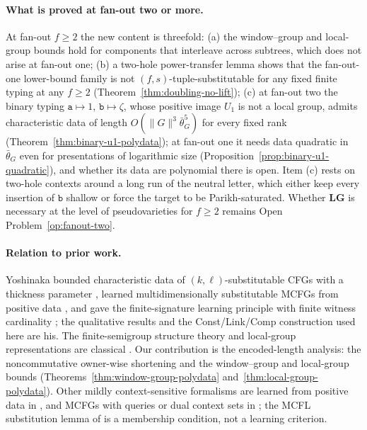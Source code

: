 \documentclass[11pt]{article}
\numberwithin{equation}{section}
\theoremstyle{plain}
\theoremstyle{definition}
\theoremstyle{remark}
\begin{document}
\paragraph{What is proved at fan-out two or more.}
At fan-out $f\ge2$ the new content is threefold: (a) the window--group and
local-group bounds hold for components that interleave across subtrees, which
does not arise at fan-out one; (b) a two-hole power-transfer lemma shows that
the fan-out-one lower-bound family is not $(f,s)$-tuple-substitutable for any
fixed finite typing at any $f\ge2$ (Theorem~\ref{thm:doubling-no-lift});
(c) at fan-out two the binary typing $\mathtt a\mapsto1$, $\mathtt b\mapsto\zeta$,
whose positive image $U_1$ is not a local group, admits characteristic data of
length $O(\|G\|^3\bar\theta_G^5)$ for every fixed rank
(Theorem~\ref{thm:binary-u1-polydata}); at fan-out one it needs data quadratic
in $\bar\theta_G$ even for presentations of logarithmic size
(Proposition~\ref{prop:binary-u1-quadratic}), and whether its data are
polynomial there is open.  Item (c) rests on two-hole contexts
around a long run of the neutral letter, which either keep every insertion of
$\mathtt b$ shallow or force the target to be Parikh-saturated.  Whether
$\mathbf{LG}$ is necessary at the level of pseudovarieties for $f\ge2$ remains
Open Problem~\ref{op:fanout-two}.

\paragraph{Relation to prior work.}
Yoshinaka bounded characteristic data of $(k,\ell)$-substitutable CFGs with
a thickness parameter \cite{Yoshinaka2008}, learned multidimensionally
substitutable MCFGs from positive data \cite{Yoshinaka2009,Yoshinaka2011},
and gave the finite-signature learning principle with finite witness
cardinality \cite{Yoshinaka2015General}; the qualitative results and the
Const/Link/Comp construction used here are his.  The finite-semigroup
structure theory and local-group representations are classical
\cite{Straubing1985,Tilson1987,AlmeidaEtAl2009}.  Our contribution is
the encoded-length analysis: the noncommutative owner-wise shortening and
the window--group and local-group bounds
(Theorems~\ref{thm:window-group-polydata} and~\ref{thm:local-group-polydata}).  Other
mildly context-sensitive formalisms are learned from positive data in
\cite{OatesEtAl2006}, and MCFGs with queries or dual context sets in
\cite{Yoshinaka2010,ClarkYoshinaka2014,KanazawaYoshinaka2023}; the MCFL
substitution lemma of \cite{DuncanEtAl2026Substitution} is a membership
condition, not a learning criterion.
\end{document}
